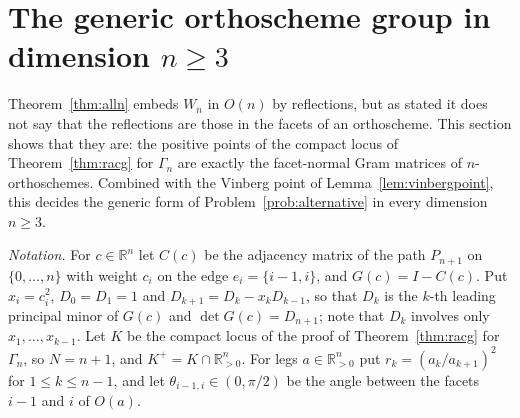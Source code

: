\documentclass[11pt]{article}
\theoremstyle{definition}
\theoremstyle{remark}
\theoremstyle{definition}
\newcommand{\R}{\mathbb{R}}
\begin{document}
\section{The generic orthoscheme group in dimension \texorpdfstring{$n\ge3$}{n>=3}}\label{sec:generic}

Theorem~\ref{thm:alln} embeds $W_n$ in $O(n)$ by reflections, but as stated it does not say that
the reflections are those in the facets of an orthoscheme. This section shows that they are: the
positive points of the compact locus of Theorem~\ref{thm:racg} for $\Gamma_n$ are exactly the
facet-normal Gram matrices of $n$-orthoschemes. Combined with the Vinberg point of
Lemma~\ref{lem:vinbergpoint}, this decides the generic form of Problem~\ref{prob:alternative} in
every dimension $n\ge3$.

\emph{Notation.} For $c\in\R^n$ let $C(c)$ be the adjacency matrix of the path $P_{n+1}$ on
$\{0,\dots,n\}$ with weight $c_i$ on the edge $e_i=\{i-1,i\}$, and $G(c)=I-C(c)$. Put
$x_i=c_i^2$, $D_0=D_1=1$ and $D_{k+1}=D_k-x_kD_{k-1}$, so that $D_k$ is the $k$-th leading
principal minor of $G(c)$ and $\det G(c)=D_{n+1}$; note that $D_k$ involves only
$x_1,\dots,x_{k-1}$. Let $K$ be the compact locus of the proof of Theorem~\ref{thm:racg} for
$\Gamma_n$, so $N=n+1$, and $K^+=K\cap\R_{>0}^n$. For legs $a\in\R_{>0}^n$ put
$r_k=(a_k/a_{k+1})^2$ for $1\le k\le n-1$, and let $\theta_{i-1,i}\in(0,\pi/2)$ be the angle
between the facets $i-1$ and $i$ of $O(a)$.
\end{document}
